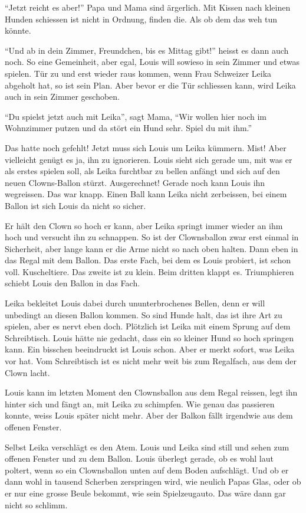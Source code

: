 \enquote{Jetzt reicht es aber!} Papa und Mama sind ärgerlich. Mit Kissen nach kleinen Hunden schiessen ist nicht in Ordnung, finden die. Als ob dem das weh tun könnte.

\enquote{Und ab in dein Zimmer, Freundchen, bis es Mittag gibt!} heisst es dann auch noch. So eine Gemeinheit, aber egal, Louis will sowieso in sein Zimmer und etwas spielen. Tür zu und erst wieder raus kommen, wenn Frau Schweizer Leika abgeholt hat, so ist sein Plan. Aber bevor er die Tür schliessen kann, wird Leika auch in sein Zimmer geschoben. 

\enquote{Du spielst jetzt auch mit Leika}, sagt Mama, \enquote{Wir wollen hier noch im Wohnzimmer putzen und da stört ein Hund sehr. Spiel du mit ihm.}

Das hatte noch gefehlt! Jetzt muss sich Louis um Leika kümmern. Mist! Aber vielleicht genügt es ja, ihn zu ignorieren. Louis sieht sich gerade um, mit was er als erstes spielen soll, als Leika furchtbar zu bellen anfängt und sich auf den neuen Clowns-Ballon stürzt. Ausgerechnet! Gerade noch kann Louis ihn wegreissen. Das war knapp. Einen Ball kann Leika nicht zerbeissen, bei einem Ballon ist sich Louis da nicht so sicher.

Er hält den Clown so hoch er kann, aber Leika springt immer wieder an ihm hoch und versucht ihn zu schnappen. So ist der Clownsballon zwar erst einmal in Sicherheit, aber lange kann er die Arme nicht so nach oben halten. Dann eben in das Regal mit dem Ballon. Das erste Fach, bei dem es Louis probiert, ist schon voll. Kuscheltiere. Das zweite ist zu klein. Beim dritten klappt es. Triumphieren schiebt Louis den Ballon in das Fach.

Leika bekleitet Louis dabei durch ununterbrochenes Bellen, denn er will unbedingt an diesen Ballon kommen. So sind Hunde halt, das ist ihre Art zu spielen, aber es nervt eben doch. Plötzlich ist Leika mit einem Sprung auf dem Schreibtisch. Louis hätte nie gedacht, dass ein so kleiner Hund so hoch springen kann. Ein bisschen beeindruckt ist Louis schon. Aber er merkt sofort, was Leika vor hat. Vom Schreibtisch ist es nicht mehr weit bis zum Regalfach, aus dem der Clown lacht. 

Louis kann im letzten Moment den Clownsballon aus dem Regal reissen, legt ihn hinter sich und fängt an, mit Leika zu schimpfen. Wie genau das passieren konnte, weiss Louis später nicht mehr. Aber der Balkon fällt irgendwie aus dem offenen Fenster.

Selbst Leika verschlägt es den Atem. Louis und Leika sind still und sehen zum offenen Fenster und zu dem Ballon. Louis überlegt gerade, ob es wohl laut poltert, wenn so ein Clownsballon unten auf dem Boden aufschlägt. Und ob er dann wohl in tausend Scherben zerspringen wird, wie neulich Papas Glas, oder ob er nur eine grosse Beule bekommt, wie sein Spielzeugauto. Das wäre dann gar nicht so schlimm.

